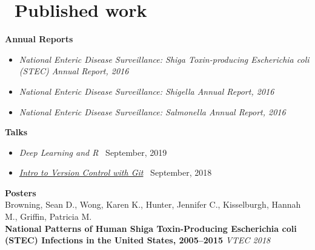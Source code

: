 \documentclass{resume}
\begin{document}
\section{\faFileTextO\ Published work}

\textbf{Annual Reports}

\begin{itemize}
  \item \textit{National Enteric Disease Surveillance: Shiga Toxin-producing Escherichia coli (STEC) Annual Report, 2016}
  \item \textit{National Enteric Disease Surveillance: Shigella Annual Report, 2016}
  \item \textit{National Enteric Disease Surveillance: Salmonella Annual Report, 2016} \\
\end{itemize}

\textbf{Talks}

\begin{itemize}
  \item \textit{Deep Learning and R} \, September, 2019
  \item \href{https://beansrowning.github.io/git-talk}{\textit{Intro to Version Control with Git}} \, September, 2018 \\
\end{itemize}

\textbf{Posters} \\

Browning, Sean D., Wong, Karen K., Hunter, Jennifer C., Kisselburgh, Hannah M., Griffin, Patricia M. \\ 
\textbf{National Patterns of Human Shiga Toxin-Producing Escherichia coli (STEC) Infections in the United States, 2005–2015} \textit{VTEC 2018} \\



%
%
\end{document}
